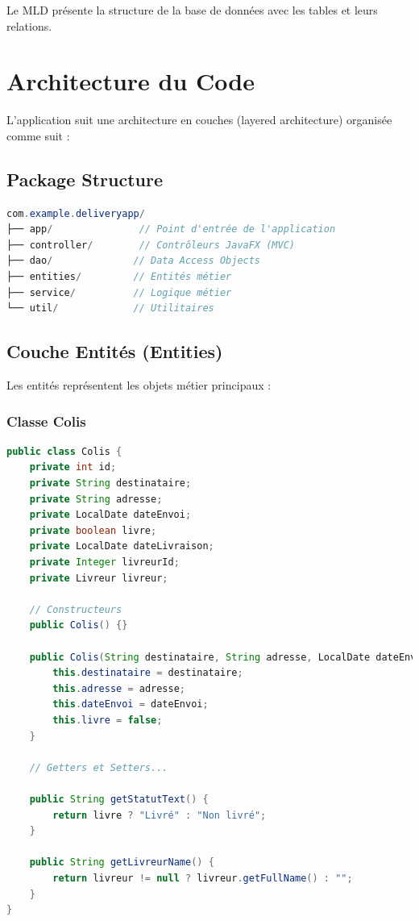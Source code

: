 \documentclass{rapportENSIAS}
\begin{document}
Le MLD pr\'{e}sente la structure de la base de donn\'{e}es avec les tables et leurs relations.

\section{Architecture du Code}

L'application suit une architecture en couches (layered architecture) organis\'{e}e comme suit :

\subsection{Package Structure}

\begin{lstlisting}[language=Java, caption=Structure des packages]
com.example.deliveryapp/
├── app/               // Point d'entrée de l'application
├── controller/        // Contrôleurs JavaFX (MVC)
├── dao/              // Data Access Objects
├── entities/         // Entités métier
├── service/          // Logique métier
└── util/             // Utilitaires
\end{lstlisting}

\subsection{Couche Entit\'{e}s (Entities)}

Les entit\'{e}s repr\'{e}sentent les objets m\'{e}tier principaux :

\subsubsection{Classe Colis}

\begin{lstlisting}[language=Java, caption=Entit\'{e} Colis]
public class Colis {
    private int id;
    private String destinataire;
    private String adresse;
    private LocalDate dateEnvoi;
    private boolean livre;
    private LocalDate dateLivraison;
    private Integer livreurId;
    private Livreur livreur;
    
    // Constructeurs
    public Colis() {}
    
    public Colis(String destinataire, String adresse, LocalDate dateEnvoi) {
        this.destinataire = destinataire;
        this.adresse = adresse;
        this.dateEnvoi = dateEnvoi;
        this.livre = false;
    }
    
    // Getters et Setters...
    
    public String getStatutText() {
        return livre ? "Livré" : "Non livré";
    }
    
    public String getLivreurName() {
        return livreur != null ? livreur.getFullName() : "";
    }
}
\end{lstlisting}
\end{document}
